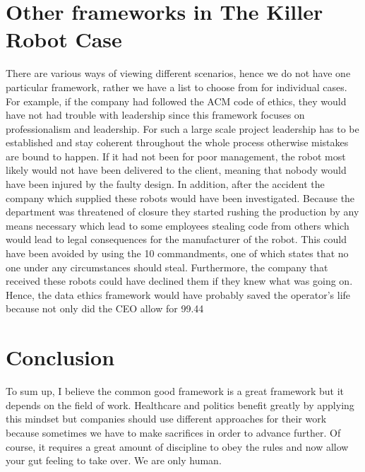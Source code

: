 \documentclass[a4paper]{article}
\begin{document}
\section*{Other frameworks in The Killer Robot Case}
There are various ways of viewing different scenarios, hence we do not have one particular framework, rather we have a list to choose from for individual cases. For example, if the company had followed the ACM code of ethics, they would have not had trouble with leadership since this framework focuses on professionalism and leadership. For such a large scale project leadership has to be established and stay coherent throughout the whole process otherwise mistakes are bound to happen. If it had not been for poor management, the robot most likely would not have been delivered to the client, meaning that nobody would have been injured by the faulty design. In addition, after the accident the company which supplied these robots would have been investigated. Because the department was threatened of closure they started rushing the production by any means necessary which lead to some employees stealing code from others which would lead to legal consequences for the manufacturer of the robot. This could have been avoided by using the 10 commandments, one of which states that no one under any circumstances should steal. Furthermore, the company that received these robots could have declined them if they knew what was going on. Hence, the data ethics framework would have probably saved the operator’s life because not only did the CEO allow for 99.44%
\section*{Conclusion}
To sum up, I believe the common good framework is a great framework but it depends on the field of work. Healthcare and politics benefit greatly by applying this mindset but companies should use different approaches for their work because sometimes we have to make sacrifices in order to advance further. Of course, it requires a great amount of discipline to obey the rules and now allow your gut feeling to take over. We are only human.
\end{document}
